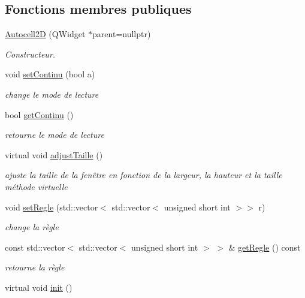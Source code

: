 \subsection*{Fonctions membres publiques}
\begin{DoxyCompactItemize}
\item 
\hyperlink{class_autocell2_d_a2e7a6a59840288dc34fef654e45f7122}{Autocell2D} (Q\+Widget $\ast$parent=nullptr)
\begin{DoxyCompactList}\small\item\em Constructeur. \end{DoxyCompactList}\item 
void \hyperlink{class_autocell2_d_a66bf641f01edbcb5c09fb1d3c97d45c5}{set\+Continu} (bool a)
\begin{DoxyCompactList}\small\item\em change le mode de lecture \end{DoxyCompactList}\item 
bool \hyperlink{class_autocell2_d_a96ed8e1716be3afb516e849d974d9eaf}{get\+Continu} ()
\begin{DoxyCompactList}\small\item\em retourne le mode de lecture \end{DoxyCompactList}\item 
virtual void \hyperlink{class_autocell2_d_a76ab804bc939ebe1957dd2ba3ea93803}{adjust\+Taille} ()
\begin{DoxyCompactList}\small\item\em ajuste la taille de la fenêtre en fonction de la largeur, la hauteur et la taille méthode virtuelle \end{DoxyCompactList}\item 
void \hyperlink{class_autocell2_d_abe5b8001ab6709eac849b03edac0c291}{set\+Regle} (std\+::vector$<$ std\+::vector$<$ unsigned short int $>$$>$ r)
\begin{DoxyCompactList}\small\item\em change la règle \end{DoxyCompactList}\item 
const std\+::vector$<$ std\+::vector$<$ unsigned short int $>$ $>$ \& \hyperlink{class_autocell2_d_a28140bde1d71db705c86ce1ace4cbea2}{get\+Regle} () const 
\begin{DoxyCompactList}\small\item\em retourne la règle \end{DoxyCompactList}\item 
virtual void \hyperlink{class_autocell2_d_a9380918c9f11ff223223672685b2cdb7}{init} ()
$$
\end{DoxyCompactItemize}
